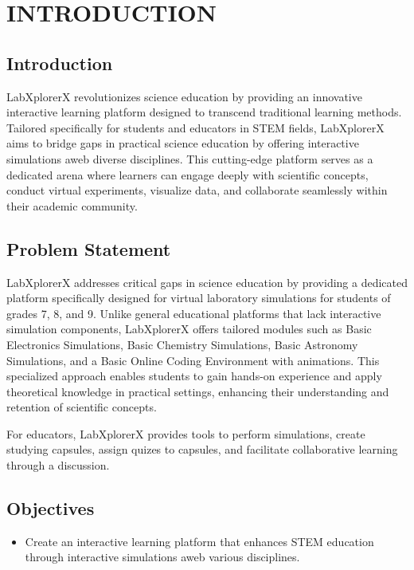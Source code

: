 \chapter{INTRODUCTION}



\section{Introduction}
LabXplorerX revolutionizes science education by providing an innovative interactive learning platform designed to transcend traditional learning methods. Tailored specifically for students and educators in STEM fields, LabXplorerX aims to bridge gaps in practical science education by offering interactive simulations aweb diverse disciplines. This cutting-edge platform serves as a dedicated arena where learners can engage deeply with scientific concepts, conduct virtual experiments, visualize data, and collaborate seamlessly within their academic community.


\section{Problem Statement }
LabXplorerX addresses critical gaps in science education by providing a dedicated platform specifically designed for virtual laboratory simulations for students of grades 7, 8, and 9. Unlike general educational platforms that lack interactive simulation components, LabXplorerX offers tailored modules such as Basic Electronics Simulations, Basic Chemistry Simulations, Basic Astronomy Simulations, and a Basic Online Coding Environment with animations. This specialized approach enables students to gain hands-on experience and apply theoretical knowledge in practical settings, enhancing their understanding and retention of scientific concepts.

For educators, LabXplorerX provides tools to perform simulations, create studying capsules, assign quizes to capsules, and facilitate collaborative learning through a discussion. 
\section{Objectives}
\begin{itemize}
    \item Create an interactive learning platform that enhances STEM education through interactive simulations aweb various disciplines.
\end{itemize}
